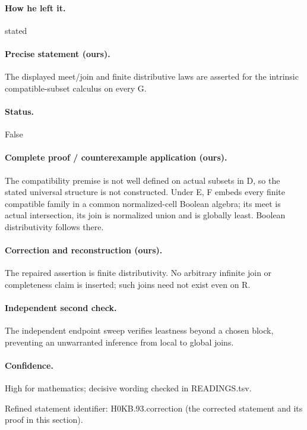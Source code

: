 \paragraph{How he left it.} stated

\paragraph{Precise statement (ours).} The displayed meet/join and finite distributive laws are asserted for the intrinsic compatible-subset calculus on every G.

\paragraph{Status.} False

\paragraph{Complete proof / counterexample application (ours).} The compatibility premise is not well defined on actual subsets in D, so the stated universal structure is not constructed. Under E, F embeds every finite compatible family in a common normalized-cell Boolean algebra; its meet is actual intersection, its join is normalized union and is globally least. Boolean distributivity follows there.

\paragraph{Correction and reconstruction (ours).} The repaired assertion is finite distributivity. No arbitrary infinite join or completeness claim is inserted; such joins need not exist even on R.

\paragraph{Independent second check.} The independent endpoint sweep verifies leastness beyond a chosen block, preventing an unwarranted inference from local to global joins.

\paragraph{Confidence.} High for mathematics; decisive wording checked in READINGS.tsv.

\noindent Refined statement identifier: H0KB.93.correction (the corrected statement and its proof in this section).

